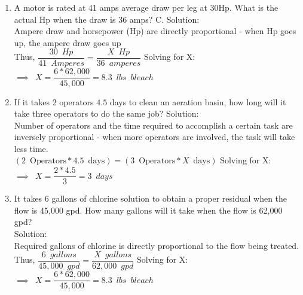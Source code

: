 \documentclass{article}
\begin{document}
\begin{enumerate}
\item A motor is rated at 41 amps average draw per leg at $30 \mathrm{Hp}$. What is the actual $\mathrm{Hp}$ when the draw is 36 amps? C. 
\vspace{0.2cm}
Solution:\\
\vspace{0.2cm}
Ampere draw and horsepower (Hp) are directly proportional - when Hp goes up, the ampere draw goes up\\
\vspace{0.2cm}
Thus, $\dfrac{30 \enspace Hp}{41 \enspace Amperes }=\dfrac{X \enspace Hp}{36 \enspace amperes}$
\vspace{0.2cm}
Solving for X:\\
\vspace{0.2cm}
$\implies \enspace X=\dfrac{6*62,000}{45,000}=\boxed{8.3 \enspace lbs \enspace bleach}$
\vspace{0.2cm}
\item If it takes 2 operators $4.5$ days to clean an aeration basin, how long will it take three operators to do the same job?
\vspace{0.2cm}
Solution:\\
\vspace{0.2cm}
Number of operators and the time required to accomplish a certain task are inversely proportional - when more operators are involved, the task will take less time.\\
\vspace{0.2cm}
$(2 \enspace \mathrm{Operators} * 4.5 \enspace \mathrm{days})=(3 \enspace \mathrm{Operators} * X \enspace \mathrm{days})$
\vspace{0.2cm}
Solving for X:\\
\vspace{0.2cm}
$\implies \enspace X=\dfrac{2*4.5}{3}=\boxed{3 \enspace days}$
\vspace{0.2cm}

\item It takes 6 gallons of chlorine solution to obtain a proper residual when the flow is 45,000 gpd. How many gallons will it take when the flow is 62,000 gpd?\\
\vspace{0.2cm}
Solution:\\
\vspace{0.2cm}
Required gallons of chlorine is directly proportional to the flow being treated.\\
\vspace{0.2cm}
Thus, $\dfrac{6 \enspace gallons}{45,000 \enspace gpd }=\dfrac{X \enspace gallons}{62,000 \enspace gpd}$
\vspace{0.2cm}
Solving for X:\\
\vspace{0.2cm}
$\implies \enspace X=\dfrac{6*62,000}{45,000}=\boxed{8.3 \enspace lbs \enspace bleach}$
\vspace{0.2cm}


\end{enumerate}
\end{document}
